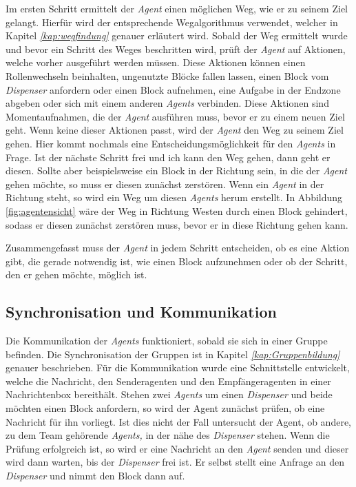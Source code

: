Im ersten Schritt ermittelt der \textit{Agent} einen möglichen Weg, wie er zu seinem Ziel gelangt. Hierfür wird der entsprechende Wegalgorithmus verwendet, welcher in Kapitel \textit{\ref{kap:wegfindung}} genauer erläutert wird. Sobald der Weg ermittelt wurde und bevor ein Schritt des Weges beschritten wird, prüft der \textit{Agent} auf Aktionen, welche vorher ausgeführt werden müssen. Diese Aktionen können einen Rollenwechseln beinhalten, ungenutzte Blöcke fallen lassen, einen Block vom \textit{Dispenser} anfordern oder einen Block aufnehmen, eine Aufgabe in der Endzone abgeben oder sich mit einem anderen \textit{Agents} verbinden. Diese Aktionen sind Momentaufnahmen, die der \textit{Agent} ausführen muss, bevor er zu einem neuen Ziel geht. Wenn keine dieser Aktionen passt, wird der \textit{Agent} den Weg zu seinem Ziel gehen. Hier kommt nochmals eine Entscheidungsmöglichkeit für den \textit{Agents} in Frage. Ist der nächste Schritt frei und ich kann den Weg gehen, dann geht er diesen. Sollte aber beispielsweise ein Block in der Richtung sein, in die der \textit{Agent} gehen möchte, so muss er diesen zunächst zerstören. Wenn ein \textit{Agent} in der Richtung steht, so wird ein Weg um diesen \textit{Agents} herum erstellt. In Abbildung \ref{fig:agentensicht} wäre der Weg in Richtung Westen durch einen Block gehindert, sodass er diesen zunächst zerstören muss, bevor er in diese Richtung gehen kann. 

Zusammengefasst muss der \textit{Agent} in jedem Schritt entscheiden, ob es eine Aktion gibt, die gerade notwendig ist, wie einen Block aufzunehmen oder ob der Schritt, den er gehen möchte, möglich ist.  

\subsection{Synchronisation und Kommunikation} \label{kap:kommunikation}
Die Kommunikation der \textit{Agents} funktioniert, sobald sie sich in einer Gruppe befinden. Die Synchronisation der Gruppen ist in Kapitel \textit{\ref{kap:Gruppenbildung}} genauer beschrieben. Für die Kommunikation wurde eine Schnittstelle entwickelt, welche die Nachricht, den Senderagenten und den Empfängeragenten in einer Nachrichtenbox bereithält. Stehen zwei \textit{Agents} um einen \textit{Dispenser} und beide möchten einen Block anfordern, so wird der Agent zunächst prüfen, ob eine Nachricht für ihn vorliegt. Ist dies nicht der Fall untersucht der Agent, ob andere, zu dem Team gehörende \textit{Agents,} in der nähe des \textit{Dispenser} stehen. Wenn die Prüfung erfolgreich ist, so wird er eine Nachricht an den \textit{Agent} senden und dieser wird dann warten, bis der \textit{Dispenser} frei ist. Er selbst stellt eine Anfrage an den \textit{Dispenser} und nimmt den Block dann auf.
